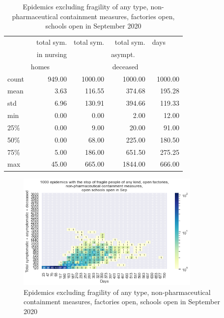 \documentclass[11pt]{article}
\begin{document}
\begin{table}[H]
\center
\small
\begin{tabular}{lrrrr}
\toprule
{} & total sym.        &  total sym. & total sym.     & days~~~~ \\
{} & in nursing        &                  & asympt.~~~  & \\
{} & homes~~~~~  &                  & deceased~~ & \\
\midrule
count &     949.00 &             1000.00 &                 1000.00 & 1000.00 \\
mean  &       3.63 &              116.55 &                  374.68 &  195.28 \\
std   &       6.96 &              130.91 &                  394.66 &  119.33 \\
min   &       0.00 &                0.00 &                    2.00 &   12.00 \\
25\%   &       0.00 &                9.00 &                   20.00 &   91.00 \\
50\%   &       0.00 &               68.00 &                  225.00 &  180.50 \\
75\%   &       5.00 &              186.00 &                  651.50 &  275.25 \\
max   &      45.00 &              665.00 &                 1844.00 &  666.00 \\
\bottomrule
\end{tabular}

\label{EpidemicsNoAllFragileFacsOnSchOnT}
\caption{Epidemics excluding fragility of any type, non-pharmaceutical containment measures, factories open, schools open in September 2020}
\end{table}


\begin{figure}[H]
\begin{center}
\includegraphics[width=0.8\textwidth]{HM30_readRunResults1k_with_NoAllFrag_openFacs_at20_openSchoolSep_plusHMlog.png}
\caption{Epidemics excluding fragility of any type, non-pharmaceutical containment measures, factories open, schools open in September 2020}
\label{EpidemicsNoAllFragileFacsOnSchOnHM}
\end{center}
\end{figure}
\end{document}
